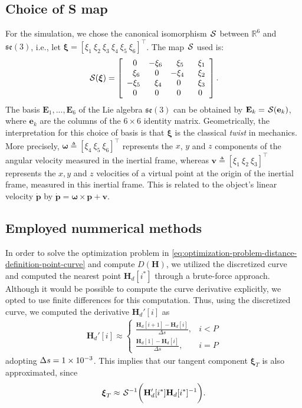 \subsection{Choice of S map}
For the simulation, we chose the canonical isomorphism $\SL$ between $\mathbb{R}^6$ and $\mathfrak{se}(3)$, i.e., let $\boldsymbol{\xi} = [\xi_1 \ \xi_2 \ \xi_3 \ \xi_4 \ \xi_5 \ \xi_6]^\top$. The map $\SL$ used is:
\begin{equation}
    \SL[\boldsymbol{\xi}] = \left[\begin{array}{cccc} 
    \ 0 & -\xi_6 & \ \ \xi_5 & \ \ \xi_1 \\
    \ \ \xi_6 & \ 0 & -\xi_4 & \ \ \xi_2 \\
    -\xi_5 & \ \ \xi_4 & \ 0 & \ \ \xi_3 \\
    \ 0 & \ 0 & \ 0 & \ 0
    \end{array}\right].
\end{equation}
The basis $\mathbf{E}_1, ... ,\mathbf{E}_6$ of the Lie algebra $\mathfrak{se}(3)$ can be obtained by $\mathbf{E}_k = \SL[\mathbf{e}_k]$, where $\mathbf{e}_k$ are the columns of the $6 \times 6$ identity matrix. Geometrically, the interpretation for this choice of basis is that $\boldsymbol{\xi}$ is the classical \emph{twist} in mechanics. More precisely, $\boldsymbol{\omega} \triangleq [\xi_4 \  \xi_5 \  \xi_6]^\top$ represents the $x$, $y$ and $z$ components of the angular  velocity  measured in the inertial frame, whereas $\mathbf{v} \triangleq [\xi_1 \  \xi_2 \  \xi_3]^\top$ represents the $x, y$ and $z$ velocities of a virtual point at the origin of the inertial frame, measured in this inertial frame. This is related to the object's linear velocity $\dot{\mathbf{p}}$  by $\dot{\mathbf{p}} = \boldsymbol{\omega} \times \mathbf{p} + \mathbf{v}$.

\subsection{Employed nummerical methods}
In order to solve the optimization problem in \eqref{eq:optimization-problem-distance-definition-point-curve} and compute $D(\mathbf{H})$, we utilized the discretized curve and computed the nearest point $\mathbf{H}_d[i^*]$ through a brute-force approach. Although it would be possible to compute the curve derivative explicitly, we opted to use finite differences for this computation. Thus, using the discretized curve, we computed the derivative $\mathbf{H}_d'[i]$ as
\begin{align}
    \mathbf{H}_d'[i] \approx \begin{cases}
        \frac{\mathbf{H}_d[i+1] - \mathbf{H}_d[i]}{\Delta s}, &  i < P\\    
        \frac{\mathbf{H}_d[1] - \mathbf{H}_d[i]}{\Delta s}, &  i = P
    \end{cases}
\end{align}
adopting $\Delta s = \num{1E-3}$. This implies that our tangent component $\boldsymbol{\xi}_T$ is also approximated, since
\begin{align}
    \boldsymbol{\xi}_T \approx \invSL\biggl(\mathbf{H}_d'[i^*]\mathbf{H}_d[i^*]^{-1}\biggr).
\end{align}

